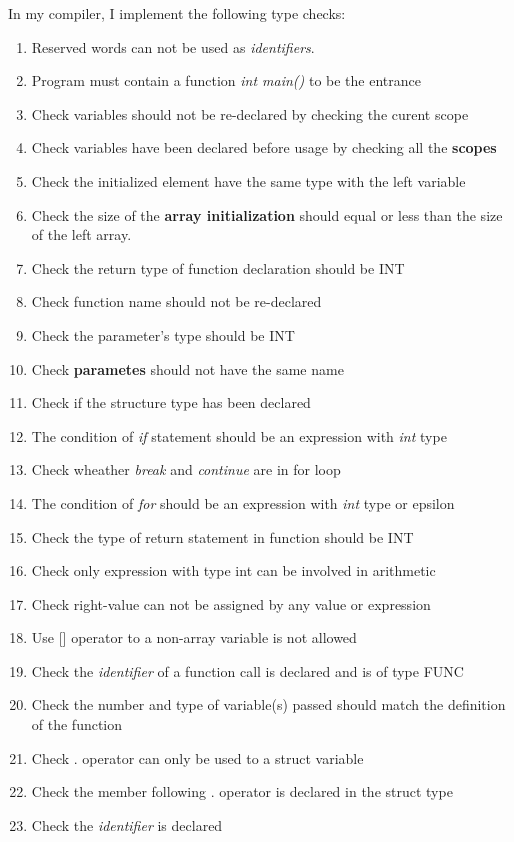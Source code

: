\documentclass[a4paper]{article}
\begin{document}
In my compiler, I implement the following type checks:
\begin{enumerate}
    \item Reserved words can not be used as \textit{identifiers}.
    \item Program must contain a function \textit{int main()} to be the entrance
    \item Check variables should not be re-declared by checking the curent scope
    \item Check variables have been declared before usage by checking all the \textbf{scopes}
    \item Check the initialized element have the same type with the left variable
    \item Check the size of the \textbf{array initialization} should equal or less than the size of the left array.
    \item Check the return type of function declaration should be INT
    \item Check function name should not be re-declared
    \item Check the parameter's type should be INT
    \item Check \textbf{parametes} should not have the same name
    \item Check if the structure type has been declared
    \item The condition of \textit{if} statement should be an expression with \textit{int} type
    \item Check wheather \textit{break} and \textit{continue} are in for loop
    \item The condition of \textit{for} should be an expression with \textit{int} type or epsilon
    \item Check the type of return statement in function should be INT
    \item Check only expression with type int can be involved in arithmetic
    \item Check right-value can not be assigned by any value or expression
    \item Use [] operator to a non-array variable is not allowed
    \item Check the \textit{identifier} of a function call is declared and is of type FUNC
    \item Check the number and type of variable(s) passed should match the definition of the function
    \item Check . operator can only be used to a struct variable
    \item Check the member following . operator is declared in the struct type
    \item Check the \textit{identifier} is declared
\end{enumerate}
\end{document}
